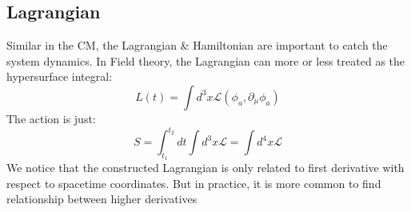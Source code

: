 \documentclass{article}
\begin{document}
\subsection{Lagrangian}
Similar in the CM, the Lagrangian \& Hamiltonian are important to catch the system
dynamics. In Field theory, the Lagrangian can more or less treated as the hypersurface
integral:
\begin{equation}
    L(t)=\int d^{3} x \mathcal{L}\left(\phi_{a},\partial_{\mu}\phi_{a}\right)
\end{equation}
The action is just:
\begin{equation}
    S=\int_{t_{1}}^{t_{2}} d t \int d^{3} x \mathcal{L}=\int d^{4} x \mathcal{L}
\end{equation}
We notice that the constructed Lagrangian is only related to first derivative with
respect to spacetime coordinates. But in practice, it is more common to find relationship
between higher derivatives
\end{document}
